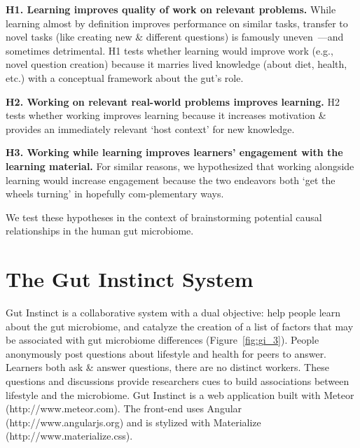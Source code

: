 \textbf{H1. Learning improves quality of work on relevant problems.}
While learning almost by definition improves performance on similar tasks, transfer to novel tasks (like creating new \& different questions) is famously uneven~\cite{Boden2004}---and sometimes detrimental. H1 tests whether learning would improve work (e.g., novel question creation) because it marries lived knowledge (about diet, health, etc.) with a conceptual framework about the gut’s role.

\textbf{H2. Working on relevant real-world problems improves learning.}
H2 tests whether working improves learning because it increases motivation \& provides an immediately relevant ‘host context’ for new knowledge.
 
\textbf{H3. Working while learning improves learners’ engagement with the learning material.} 
For similar reasons, we hypothesized that working alongside learning would increase engagement because the two endeavors both ‘get the wheels turning’ in hopefully com-plementary ways.

We test these hypotheses in the context of brainstorming potential causal relationships in the human gut microbiome. 

\section{The Gut Instinct System}
Gut Instinct is a collaborative system with a dual objective: help people learn about the gut microbiome, and catalyze the creation of a list of factors that may be associated with gut microbiome differences (Figure~\ref{fig:gi_3}). People anonymously post questions about lifestyle and health for peers to answer. Learners both ask \& answer questions, there are
no distinct workers. These questions and discussions provide researchers cues to build associations between lifestyle and the microbiome.
Gut Instinct is a web application built with Meteor (http://www.meteor.com). The front-end uses Angular (http://www.angularjs.org) and is stylized with Materialize (http://www.materialize.css).

